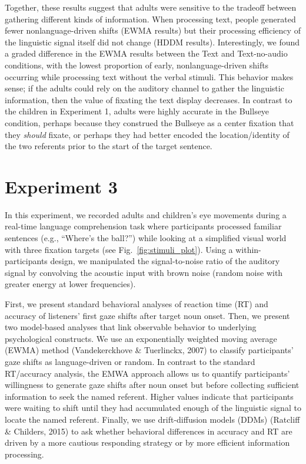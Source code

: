 \documentclass[english,man]{apa6}
\theoremstyle{definition}
\theoremstyle{definition}
\theoremstyle{definition}
\theoremstyle{remark}
\begin{document}
Together, these results suggest that adults were sensitive to the
tradeoff between gathering different kinds of information. When
processing text, people generated fewer nonlanguage-driven shifts (EWMA
results) but their processing efficiency of the linguistic signal itself
did not change (HDDM results). Interestingly, we found a graded
difference in the EWMA results between the Text and Text-no-audio
conditions, with the lowest proportion of early, nonlanguage-driven
shifts occurring while processing text without the verbal stimuli. This
behavior makes sense; if the adults could rely on the auditory channel
to gather the linguistic information, then the value of fixating the
text display decreases. In contrast to the children in Experiment 1,
adults were highly accurate in the Bullseye condition, perhaps because
they construed the Bullseye as a center fixation that they \emph{should}
fixate, or perhaps they had better encoded the location/identity of the
two referents prior to the start of the target sentence.

\hypertarget{experiment-3}{%
\section{Experiment 3}\label{experiment-3}}

In this experiment, we recorded adults and children's eye movements
during a real-time language comprehension task where participants
processed familiar sentences (e.g., \enquote{Where's the ball?}) while
looking at a simplified visual world with three fixation targets (see
Fig.~\ref{fig:stimuli_plot}). Using a within-participants design, we
manipulated the signal-to-noise ratio of the auditory signal by
convolving the acoustic input with brown noise (random noise with
greater energy at lower frequencies).

First, we present standard behavioral analyses of reaction time (RT) and
accuracy of listeners' first gaze shifts after target noun onset. Then,
we present two model-based analyses that link observable behavior to
underlying psychological constructs. We use an exponentially weighted
moving average (EWMA) method (Vandekerckhove \& Tuerlinckx, 2007) to
classify participants' gaze shifts as language-driven or random. In
contrast to the standard RT/accuracy analysis, the EMWA approach allows
us to quantify participants' willingness to generate gaze shifts after
noun onset but before collecting sufficient information to seek the
named referent. Higher values indicate that participants were waiting to
shift until they had accumulated enough of the linguistic signal to
locate the named referent. Finally, we use drift-diffusion models (DDMs)
(Ratcliff \& Childers, 2015) to ask whether behavioral differences in
accuracy and RT are driven by a more cautious responding strategy or by
more efficient information processing.
\end{document}
